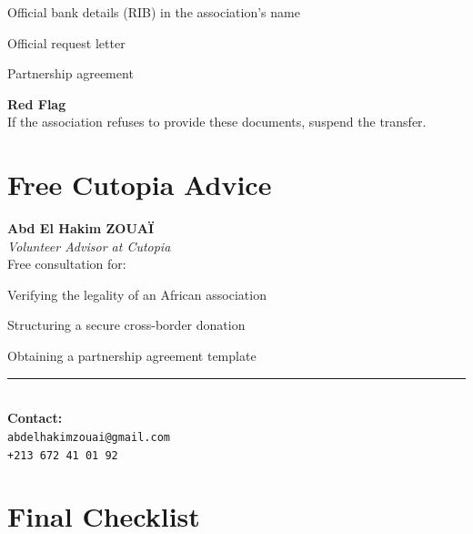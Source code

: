 \documentclass[12pt, a4paper]{article}
\begin{document}
\begin{tcolorbox}[colback=darkgray!5!white, colframe=darkgray!75!black, title=\textbf{Category 4: Banking Documents}]
\begin{starredlist}
    \item Official bank details (RIB) in the association's name
    \item Official request letter
    \item Partnership agreement
\end{starredlist}
\end{tcolorbox}

\begin{alertbox}
    \centering
    \textbf{Red Flag} \\
    If the association refuses to provide these documents, suspend the transfer.
\end{alertbox}

\newpage

\section*{Free Cutopia Advice}

\begin{conseilbox}
    \centering
    {\Large \textbf{Abd El Hakim ZOUAÏ}} \\[0.2cm]
    \textit{Volunteer Advisor at Cutopia} \\[0.3cm]
    
    Free consultation for:
    \begin{starredlist}
        \item Verifying the legality of an African association
        \item Structuring a secure cross-border donation
        \item Obtaining a partnership agreement template
    \end{starredlist}
    
    \vspace{0.3cm}
    \rule{0.7\textwidth}{0.3pt} \\[0.3cm]
    \textbf{Contact:} \\
    \texttt{abdelhakimzouai@gmail.com} \\[0.2cm]
    \texttt{+213 672 41 01 92}
\end{conseilbox}

\newpage

\section*{Final Checklist}
\end{document}
